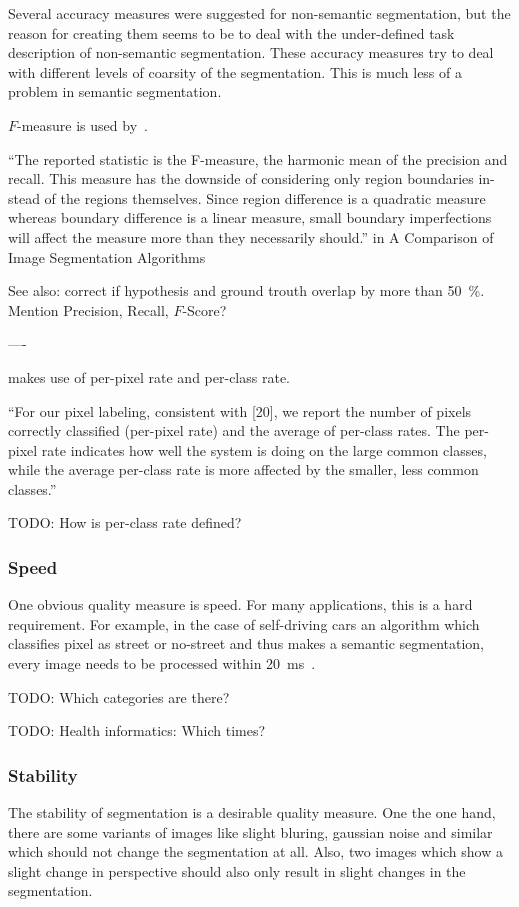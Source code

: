 Several accuracy measures were suggested for non-semantic
segmentation,\cite{martin2001database} but the reason for creating them seems
to be to deal with the under-defined task description of non-semantic
segmentation. These accuracy measures try to deal with different levels of
coarsity of the segmentation. This is much less of a problem in semantic
segmentation.

$F$-measure is used by~\cite{cohen2015memory}.

\enquote{The reported statistic is the F-measure, the harmonic mean of the precision
and recall. This measure has the downside of considering only region boundaries
in- stead of the regions themselves. Since region difference is a quadratic
measure whereas boundary difference is a linear measure, small boundary
imperfections will affect the measure more than they necessarily should.} in
A Comparison of Image Segmentation Algorithms

See also: \cite{yang2012layered,tighe2014scene} correct if hypothesis and
ground trouth overlap by more than \SI{50}{\percent}.
Mention Precision, Recall, $F$-Score?

----

\cite{tighe2014scene} makes use of per-pixel rate and per-class rate.

\enquote{For our pixel labeling, consistent with [20], we report the
number of pixels correctly classified (per-pixel rate) and the
average of per-class rates. The per-pixel rate indicates how
well the system is doing on the large common classes, while
the average per-class rate is more affected by the smaller,
less common classes.}

TODO: How is per-class rate defined?


\subsubsection{Speed}\label{subsubsec:speed-quality-measure}
One obvious quality measure is speed. For many applications, this is a hard
requirement. For example, in the case of self-driving cars an algorithm which
classifies pixel as street or no-street and thus makes a semantic segmentation,
every image needs to be processed within
\SI{20}{\milli\second}~\cite{bittel2015pixel}.

TODO: Which categories are there?

TODO: Health informatics: Which times?


\subsubsection{Stability}\label{subsubsec:stability-quality-measure}
The stability of segmentation is a desirable quality measure. One the one hand,
there are some variants of images like slight bluring, gaussian noise and
similar which should not change the segmentation at all. Also, two images which
show a slight change in perspective should also only result in slight changes
in the segmentation.\cite{pantofaru2005comparison}

